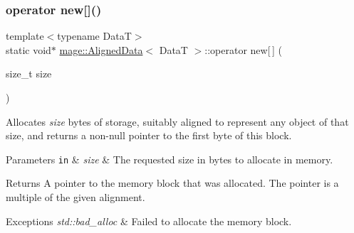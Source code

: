 \subsubsection{\texorpdfstring{operator new[]()}{operator new[]()}}
{\footnotesize\ttfamily template$<$typename DataT$>$ \\
static void$\ast$ \hyperlink{structmage_1_1_aligned_data}{mage\+::\+Aligned\+Data}$<$ DataT $>$\+::operator new\mbox{[}$\,$\mbox{]} (\begin{DoxyParamCaption}\item[{size\+\_\+t}]{size }\end{DoxyParamCaption})\hspace{0.3cm}{\ttfamily [static]}}

Allocates {\itshape size} bytes of storage, suitably aligned to represent any object of that size, and returns a non-\/null pointer to the first byte of this block.


\begin{DoxyParams}[1]{Parameters}
\mbox{\tt in}  & {\em size} & The requested size in bytes to allocate in memory. \\
\hline
\end{DoxyParams}
\begin{DoxyReturn}{Returns}
A pointer to the memory block that was allocated. The pointer is a multiple of the given alignment. 
\end{DoxyReturn}

\begin{DoxyExceptions}{Exceptions}
{\em std\+::bad\+\_\+alloc} & Failed to allocate the memory block. \\
\hline
\end{DoxyExceptions}
